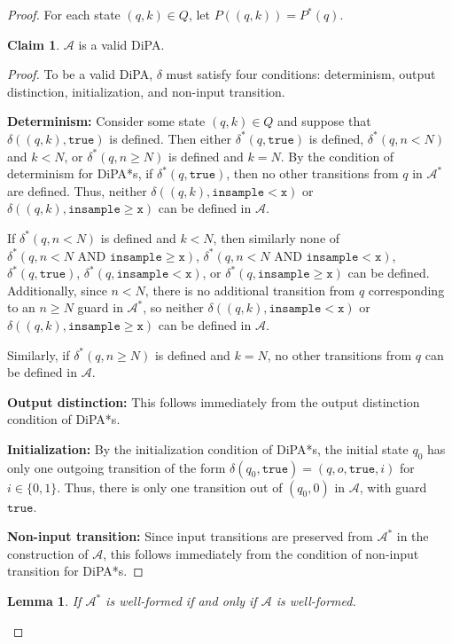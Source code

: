 \documentclass[12pt]{article}
\newcommand{\gguard}{\texttt{insample}\geq \texttt{x}}
\newcommand{\lguard}{\texttt{insample} < \texttt{x}}
\newcommand{\gaguard}{n<N \text{ AND } \texttt{insample} \geq \texttt{x}}
\newcommand{\laguard}{n<N\text{ AND }\texttt{insample} < \texttt{x}}
\newtheorem{lemma}[thm]{Lemma}
\theoremstyle{definition}
\newtheorem{clm}[thm]{Claim}
\begin{document}
\begin{proof}
For each state $(q, k)\in Q$, let $P((q, k)) = P^*(q)$.

\begin{clm}
	$\mathcal{A}$ is a valid DiPA.
\end{clm}
\begin{proof}
	To be a valid DiPA, $\delta$ must satisfy four conditions: determinism, output distinction, initialization, and non-input transition. 

	\textbf{Determinism:} Consider some state $(q, k)\in Q$ and suppose that $\delta((q, k), \texttt{true})$ is defined. Then either $\delta^*(q, \texttt{true})$ is defined, $\delta^*(q, n <N)$ and $k < N$, or $\delta^*(q, n\geq N)$ is defined and $k = N$. By the condition of determinism for DiPA*s, if $\delta^*(q, \texttt{true})$, then no other transitions from $q$ in $\mathcal{A}^*$ are defined. Thus, neither $\delta((q, k), \lguard)$ or $\delta((q, k), \gguard)$ can be defined in $\mathcal{A}$.

	If $\delta^*(q, n < N)$ is defined and $k < N$, then similarly none of $\delta^*(q, \gaguard)$, $\delta^*(q, \laguard)$, $\delta^*(q, \texttt{true})$, $\delta^*(q, \lguard)$, or $\delta^*(q, \gguard)$ can be defined. Additionally, since $ n < N$, there is no additional transition from $q$ corresponding to an $n\geq N$ guard in $\mathcal{A}^*$, so neither $\delta((q, k), \lguard)$ or $\delta((q, k), \gguard)$ can be defined in $\mathcal{A}$.

	Similarly, if $\delta^*(q, n \geq N)$ is defined and $k = N$, no other transitions from $q$ can be defined in $\mathcal{A}$.

	\textbf{Output distinction:} This follows immediately from the output distinction condition of DiPA*s.

	\textbf{Initialization:} By the initialization condition of DiPA*s, the initial state $q_0$ has only one outgoing transition of the form $\delta(q_0, \texttt{true}) = (q, o, \texttt{true}, i)$ for $i\in \{0, 1\}$. Thus, there is only one transition out of $(q_0, 0)$ in $\mathcal{A}$, with guard $\texttt{true}$.

	\textbf{Non-input transition:} Since input transitions are preserved from $\mathcal{A}^*$ in the construction of $\mathcal{A}$, this follows immediately from the condition of non-input transition for DiPA*s.
\end{proof}



\begin{lemma}\label{wellformedequiv}
	If $\mathcal{A}^*$ is well-formed if and only if $\mathcal{A}$ is well-formed.	
\end{lemma}


\end{proof}
\end{document}
